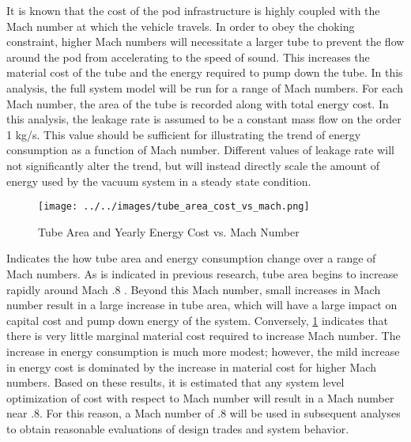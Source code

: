 It is known that the cost of the pod infrastructure is highly coupled with the Mach number at which the vehicle travels. In order to obey the choking constraint, higher Mach numbers will necessitate a larger tube to prevent the flow around the pod from accelerating to the speed of sound. This increases the material cost of the tube and the energy required to pump down the tube. In this analysis, the full system model will be run for a range of Mach numbers. For each Mach number, the area of the tube is recorded along with total energy cost. In this analysis, the leakage rate is assumed to be a constant mass flow on the order 1 kg/s. This value should be sufficient for illustrating the trend of energy consumption as a function of Mach number. Different values of leakage rate will not significantly alter the trend, but will instead directly scale the amount of energy used by the vacuum system in a steady state condition.
\begin{figure}
	\centering
	\texttt{[image: ../../images/tube\_area\_cost\_vs\_mach.png]}
	\caption{Tube Area and Yearly Energy Cost vs. Mach Number}
	\label{fig:tube_area_cost_vs_mach}
\end{figure}
 Indicates the how tube area and energy consumption change over a range of Mach numbers. As is indicated in previous research, tube area begins to increase rapidly around Mach .8 \cite{Chin}. Beyond this Mach number, small increases in Mach number result in a large increase in tube area, which will have a large impact on capital cost and pump down energy of the system. Conversely, \cref{fig:tube_area_cost_vs_mach} indicates that there is very little marginal material cost required to increase Mach number. The increase in energy consumption is much more modest; however, the mild increase in energy cost is dominated by the increase in material cost for higher Mach numbers. Based on these results, it is estimated that any system level optimization of cost with respect to Mach number will result in a Mach number near .8. For this reason, a Mach number of .8 will be used in subsequent analyses to obtain reasonable evaluations of design trades and system behavior.
